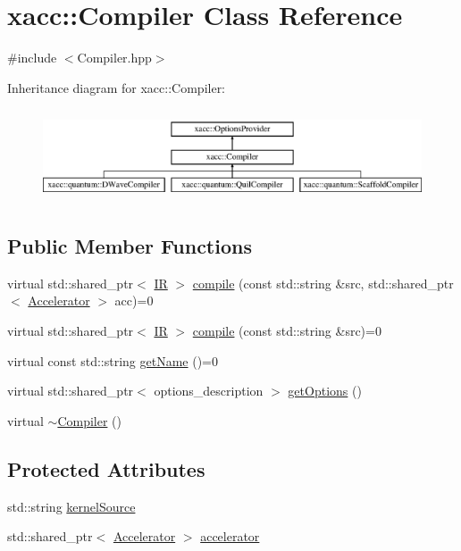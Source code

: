 \hypertarget{a00020}{}\section{xacc\+:\+:Compiler Class Reference}
\label{a00020}


{\ttfamily \#include $<$Compiler.\+hpp$>$}

Inheritance diagram for xacc\+:\+:Compiler\+:\begin{figure}[H]
\begin{center}
\leavevmode
\includegraphics[height=2.772277cm]{a00020}
\end{center}
\end{figure}
\subsection*{Public Member Functions}
\begin{DoxyCompactItemize}
\item 
virtual std\+::shared\+\_\+ptr$<$ \hyperlink{a00041}{IR} $>$ \hyperlink{a00020_a546a40c95bb93af6a0c0ac48dbeaffc8}{compile} (const std\+::string \&src, std\+::shared\+\_\+ptr$<$ \hyperlink{a00011}{Accelerator} $>$ acc)=0
\item 
virtual std\+::shared\+\_\+ptr$<$ \hyperlink{a00041}{IR} $>$ \hyperlink{a00020_a9092f5f779b570c91569b59621280c04}{compile} (const std\+::string \&src)=0
\item 
virtual const std\+::string \hyperlink{a00020_a87fca9100e6462122f5b687c3a0fb3fb}{get\+Name} ()=0
\item 
virtual std\+::shared\+\_\+ptr$<$ options\+\_\+description $>$ \hyperlink{a00020_a9f5a8965c9c2dd895016d18264ebbe92}{get\+Options} ()
\item 
virtual \hyperlink{a00020_a5d0b012687d9b44893872eaa81e47b38}{$\sim$\+Compiler} ()
\end{DoxyCompactItemize}
\subsection*{Protected Attributes}
\begin{DoxyCompactItemize}
\item 
std\+::string \hyperlink{a00020_a0ad81c816c09e5113d03cdc02165c453}{kernel\+Source}
\item 
std\+::shared\+\_\+ptr$<$ \hyperlink{a00011}{Accelerator} $>$ \hyperlink{a00020_ad4cbb467fa7e377bac6c054ffcb22b7c}{accelerator}
\end{DoxyCompactItemize}


